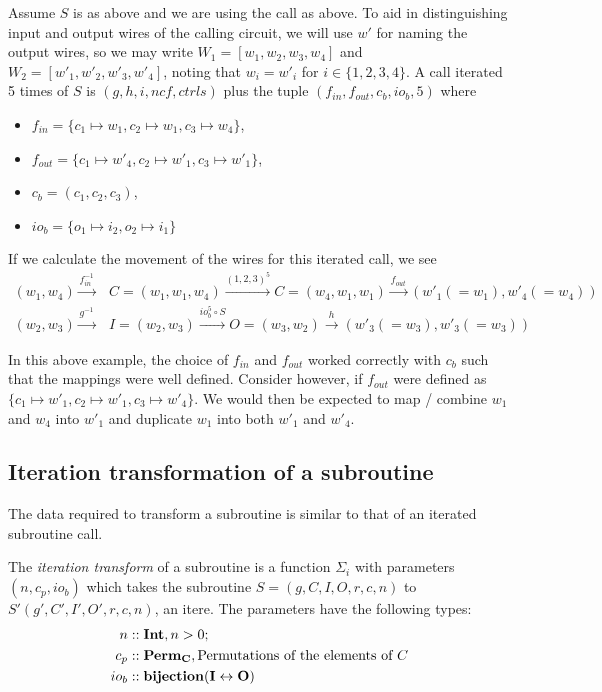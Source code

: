 \begin{example}
\end{example}
Assume $S$ is as above and we are using the call as above. To aid in distinguishing input and
output wires of the calling circuit, we will use $w'$ for naming the output wires, so we may write
$W_1 = [w_1,w_2,w_3,w_4]$ and $W_2=[w'_1,w'_2,w'_3,w'_4]$, noting that $w_i = w'_i$ for
$i\in\{1,2,3,4\}$. A call iterated 5 times of $S$ is $(g,h,i,ncf,ctrls)$ plus the tuple
$(f_{in},f_{out},c_b,io_b,5)$ where
\begin{itemize}
  \item $f_{in} = \{c_1\mapsto w_1, c_2 \mapsto w_1, c_3 \mapsto w_4\}$,
  \item $f_{out} = \{c_1\mapsto w'_4, c_2 \mapsto w'_1, c_3 \mapsto w'_1\}$,
  \item $c_b = (c_1,c_2,c_3)$,
  \item $io_b = \{o_1\mapsto i_2, o_2\mapsto i_1\}$
\end{itemize}
If we calculate the movement of the wires for this iterated call, we see
\begin{align}
  (w_1,w_4)\xrightarrow{f_{in}^{-1}} &C=(w_1,w_1,w_4) \xrightarrow{(1,2,3)^5}
    C=(w_4,w_1,w_1) \xrightarrow{f_{out}} (w'_1(=w_1),w'_4(=w_4))\\
  (w_2,w_3)\xrightarrow{g^{-1}} &I=(w_2,w_3) \xrightarrow{io_b^5\circ S}
    O=(w_3,w_2) \xrightarrow{h} (w'_3(=w_3),w'_3(=w_3))
\end{align}

In this above example, the choice of $f_{in}$ and $f_{out}$ worked correctly with $c_b$ such that
the mappings were well defined. Consider however, if $f_{out}$ were defined as $\{c_1\mapsto w'_1,
c_2 \mapsto w'_1, c_3 \mapsto w'_4\}$. We would then be expected to map / combine $w_1$ and $w_4$
into $w'_1$ and duplicate $w_1$ into both $w'_1$ and $w'_4$.


\subsection{Iteration transformation of a subroutine} %
\label{sub:iteration_transformation_of_a_subroutine}

The data required to transform a subroutine is similar to that of an iterated subroutine call.

\begin{definition}\label{def:iteration_transform}
  The \emph{iteration transform} of a subroutine is a function $\Sigma_i$ with parameters $(n,c_p,io_b)$
  which takes the subroutine $S=(g,C,I,O,r,c,n)$ to $S'(g',C',I',O',r,c,n)$, an itere. The
  parameters have the following types:
  \begin{align*}
    n&::\mathbf{{Int}}, n>0;\\
    c_p&::\mathbf{{Perm_C}}, \text{Permutations of the elements of }C\\
    io_b&::\mathbf{{bijection(I\leftrightarrow O)}}
  \end{align*}
\end{definition}

